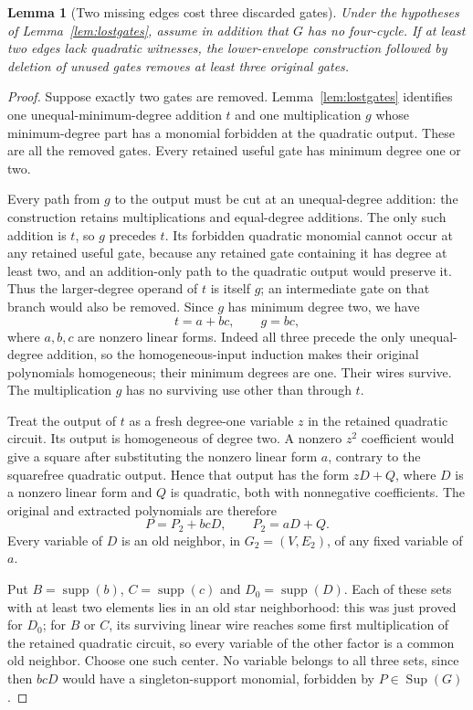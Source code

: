 \documentclass[11pt]{article}
\newcommand{\supp}{\operatorname{supp}}
\newcommand{\Sup}{\operatorname{Sup}}
\newtheorem{lemma}[theorem]{Lemma}
\theoremstyle{definition}
\theoremstyle{remark}
\begin{document}
\begin{lemma}[Two missing edges cost three discarded gates]\label{lem:threelost}
Under the hypotheses of Lemma~\ref{lem:lostgates}, assume in addition that $G$ has no four-cycle. If at least two edges lack quadratic witnesses, the lower-envelope construction followed by deletion of unused gates removes at least three original gates.
\end{lemma}
\begin{proof}
Suppose exactly two gates are removed. Lemma~\ref{lem:lostgates} identifies one unequal-minimum-degree addition $t$ and one multiplication $g$ whose minimum-degree part has a monomial forbidden at the quadratic output. These are all the removed gates. Every retained useful gate has minimum degree one or two.

Every path from $g$ to the output must be cut at an unequal-degree addition: the construction retains multiplications and equal-degree additions. The only such addition is $t$, so $g$ precedes $t$. Its forbidden quadratic monomial cannot occur at any retained useful gate, because any retained gate containing it has degree at least two, and an addition-only path to the quadratic output would preserve it. Thus the larger-degree operand of $t$ is itself $g$; an intermediate gate on that branch would also be removed. Since $g$ has minimum degree two, we have
\[
 t=a+bc,\qquad g=bc,
\]
where $a,b,c$ are nonzero linear forms. Indeed all three precede the only unequal-degree addition, so the homogeneous-input induction makes their original polynomials homogeneous; their minimum degrees are one. Their wires survive. The multiplication $g$ has no surviving use other than through $t$.

Treat the output of $t$ as a fresh degree-one variable $z$ in the retained quadratic circuit. Its output is homogeneous of degree two. A nonzero $z^2$ coefficient would give a square after substituting the nonzero linear form $a$, contrary to the squarefree quadratic output. Hence that output has the form $zD+Q$, where $D$ is a nonzero linear form and $Q$ is quadratic, both with nonnegative coefficients. The original and extracted polynomials are therefore
\[
 P=P_2+bcD,\qquad P_2=aD+Q.
\]
Every variable of $D$ is an old neighbor, in $G_2=(V,E_2)$, of any fixed variable of $a$.

Put $B=\supp(b)$, $C=\supp(c)$ and $D_0=\supp(D)$. Each of these sets with at least two elements lies in an old star neighborhood: this was just proved for $D_0$; for $B$ or $C$, its surviving linear wire reaches some first multiplication of the retained quadratic circuit, so every variable of the other factor is a common old neighbor. Choose one such center. No variable belongs to all three sets, since then $bcD$ would have a singleton-support monomial, forbidden by $P\in\Sup(G)$.


\end{proof}
\end{document}
